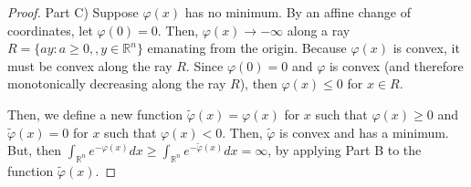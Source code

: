 \documentclass{amsart}
\theoremstyle{lemma}
\theoremstyle{remark}
\begin{document}
\begin{proof}

Part C) Suppose $\varphi(x)$ has no minimum. By an affine change of coordinates, let $\varphi(0) = 0$. Then, $\varphi(x) \rightarrow -\infty$ along a ray $R = \{ay: a\geq 0, ,y \in \mathbb{R}^n\}$ emanating from the origin. Because $\varphi(x)$ is convex, it must be convex along the ray $R$. Since $\varphi(0) = 0$ and $\varphi$ is convex (and therefore monotonically decreasing along the ray $R$), then $\varphi(x) \leq 0$ for $x \in R$.

Then, we define a new function $\tilde{\varphi}(x) = \varphi(x)$ for $x$ such that $\varphi(x) \geq 0$ and $\tilde{\varphi}(x) = 0$ for $x$ such that $\varphi(x) < 0$. Then, $\tilde{\varphi}$ is convex and has a minimum. But, then $\int_{\mathbb{R}^n} e^{-\varphi(x)}dx \geq \int_{\mathbb{R}^n} e^{-\tilde{\varphi}(x)}dx = \infty$, by applying Part B to the function $\tilde{\varphi}(x)$.


\end{proof}
\end{document}
